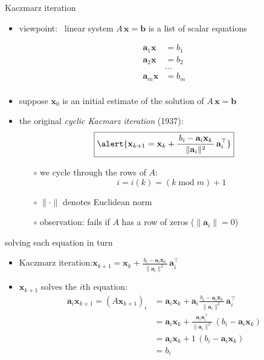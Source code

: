 \documentclass[usepdftitle=false,usenames,dvipsnames]{beamer}
\newcommand{\ba}{\mathbf{a}}
\newcommand{\bb}{\mathbf{b}}
\newcommand{\bx}{\mathbf{x}}
\newcommand{\ds}{\displaystyle}
\begin{document}
\begin{frame}{Kaczmarz iteration}

\begin{itemize}
\item viewpoint: \, linear system $A\,\bx=\bb$ is a list of scalar equations

\vspace{-6mm}
    \begin{align*}
    \ba_1 \bx &= b_1 \\
    \ba_2 \bx &= b_2 \\
              &\dots \\
    \ba_m \bx &= b_m \\
    \end{align*}

\vspace{-5mm}
\item suppose $\bx_0$ is an initial estimate of the solution of $A\,\bx=\bb$
\item the original \emph{cyclic Kacmarz iteration} (1937):
    $$\boxed{\alert{\bx_{k+1} = \bx_k + \frac{\,b_i - \ba_i \bx_k\,}{\|\ba_i\|^2}\, \ba_i^\top}}$$

    \begin{itemize}
    \item[$\circ$] we cycle through the rows of $A$:
        $$i = i(k) = (k \operatorname{mod} m) + 1$$
    \item[$\circ$] $\|\cdot\|$ denotes Euclidean norm
    \item[$\circ$] observation:  fails if $A$ has a row of zeros ($\|\ba_i\|=0$)
    \end{itemize}
\end{itemize}
\end{frame}


\begin{frame}{solving each equation in turn}

\begin{itemize}
\item Kaczmarz iteration:\quad $\ds \bx_{k+1} = \bx_k + \frac{\,b_i - \ba_i \bx_k\,}{\|\ba_i\|^2}\, \ba_i^\top$

\medskip
\item \alert{$\bx_{k+1}$ solves the $i$th equation}:
    \begin{align*}
    \ba_i \bx_{k+1} = (A \bx_{k+1})_i &= \ba_i\bx_k + \ba_i\frac{\,b_i - \ba_i \bx_k\,}{\|\ba_i\|^2}\, \ba_i^\top \\
                    &= \ba_i\bx_k + \frac{\ba_i\ba_i^\top}{\|\ba_i\|^2}\, (b_i - \ba_i \bx_k) \\
                    &= \ba_i\bx_k + 1\, (b_i - \ba_i \bx_k) \\
                    &= b_i
    \end{align*}
\end{itemize}
\end{frame}
\end{document}

